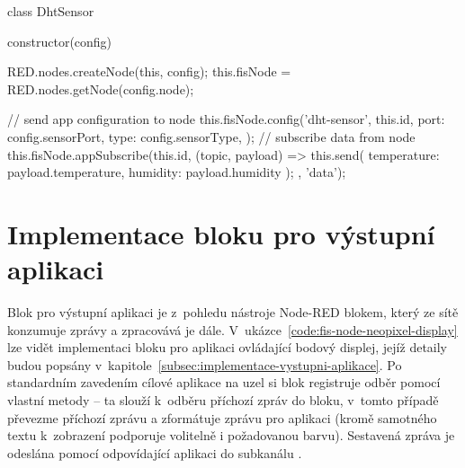 \begin{code}[
    language=Javascript,
    label=code:fis-dht-app,
    caption={Detail implementace vstupní aplikace (z~hlediska centrálního uzlu) -- jedná se o~aplikaci pro
    senzory měřící teplotu a vlhkost okolí.
    Konstruktor této třídy je zodpovědný za konfiguraci aplikace na uzlu za pomoci metody \ic{config} a následnou
    registrace odběru zprávy z uzlu -- funkce volaná na příchozí zprávy z nich přejímá data a zasílá je dále do sítě
    nástroje Node-RED (volání \ic{this.send})}.
]
class DhtSensor {
    constructor(config) {
        RED.nodes.createNode(this, config);
        this.fisNode = RED.nodes.getNode(config.node);

        // send app configuration to node
        this.fisNode.config('dht-sensor', this.id, {
            port: config.sensorPort,
            type: config.sensorType,
        });
        // subscribe data from node
        this.fisNode.appSubscribe(this.id, (topic, payload) => {
            this.send({
                temperature: payload.temperature,
                humidity: payload.humidity
            });
        }, 'data');
    }
}
\end{code}

\section{Implementace bloku pro výstupní aplikaci}\label{sec:implementace-bloku-pro-vystupni-aplikace}
Blok pro výstupní aplikaci je z~pohledu nástroje Node-RED blokem, který ze sítě konzumuje zprávy a zpracovává je dále.
V~ukázce~\ref{code:fis-node-neopixel-display} lze vidět implementaci bloku pro aplikaci ovládající bodový displej,
jejíž detaily budou popsány v~kapitole~\ref{subsec:implementace-vystupni-aplikace}.
Po standardním zavedením cílové aplikace na uzel si blok registruje odběr pomocí vlastní metody  -- ta slouží
k~odběru příchozí zpráv do bloku, v~tomto případě převezme příchozí zprávu a zformátuje zprávu pro aplikaci
(kromě samotného textu k~zobrazení podporuje volitelně i požadovanou barvu).
Sestavená zpráva je odeslána pomocí  odpovídající aplikaci do subkanálu .

